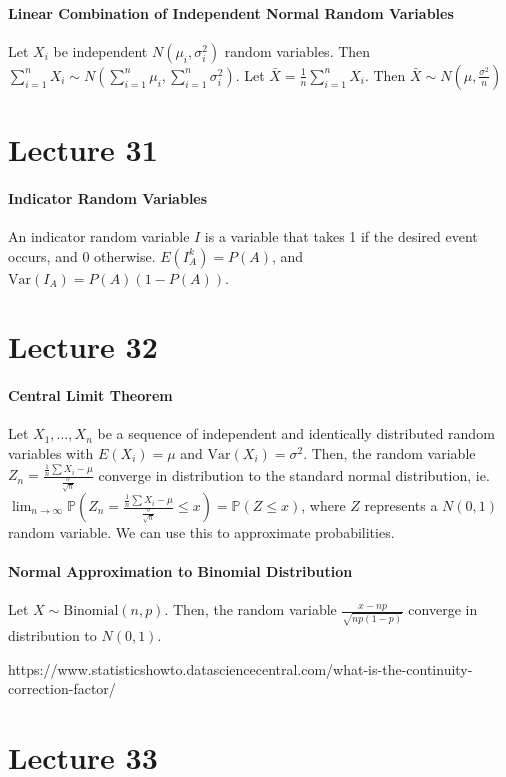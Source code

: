 \documentclass[10pt,letter]{article}
\begin{document}
\paragraph{Linear Combination of Independent Normal Random Variables}
Let $X_i$ be independent $N(\mu_i,\sigma^2_i)$ random variables. Then $\sum_{i=1}^nX_i\sim N(\sum_{i=1}^n\mu_i,\sum_{i=1}^n\sigma_i^2)$. Let $\bar{X}=\frac{1}{n}\sum_{i=1}^nX_i$. Then $\bar{X}\sim N(\mu,\frac{\sigma^2}{n})$ 

\section*{Lecture 31}
\paragraph{Indicator Random Variables}
An indicator random variable $I$ is a variable that takes 1 if the desired event occurs, and 0 otherwise. $E(I_A^k)=P(A)$, and $\text{Var}(I_A)=P(A)(1-P(A))$. 

\section*{Lecture 32}
\paragraph{Central Limit Theorem}
Let $X_1,\ldots,X_n$ be a sequence of independent and identically distributed random variables with $E(X_i)=\mu$ and $\text{Var}(X_i)=\sigma^2$. Then, the random variable $Z_n=\frac{\frac{1}{n}\sum X_i-\mu}{\frac{\sigma}{\sqrt{n}}}$ converge in distribution to the standard normal distribution, ie. $\lim_{n\rightarrow\infty}\mathbb{P}(Z_n=\frac{\frac{1}{n}\sum X_i-\mu}{\frac{\sigma}{\sqrt{n}}}\leq x)=\mathbb{P}(Z\leq x)$, where $Z$ represents a $N(0,1)$ random variable. We can use this to approximate probabilities. 
\paragraph{Normal Approximation to Binomial Distribution}
Let $X\sim\text{Binomial}(n,p)$. Then, the random variable $\frac{x-np}{\sqrt{np(1-p)}}$ converge in distribution to $N(0,1)$. 

https://www.statisticshowto.datasciencecentral.com/what-is-the-continuity-correction-factor/

\section*{Lecture 33}
\end{document}
